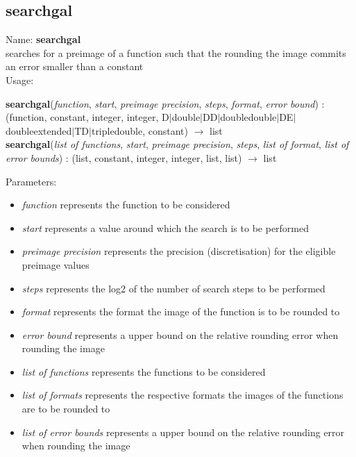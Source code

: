 \subsection{searchgal}
\label{labsearchgal}
\noindent Name: \textbf{searchgal}\\
searches for a preimage of a function such that the rounding the image commits an error smaller than a constant\\

\noindent Usage: 
\begin{center}
\textbf{searchgal}(\emph{function}, \emph{start}, \emph{preimage precision}, \emph{steps}, \emph{format}, \emph{error bound}) : (\textsf{function}, \textsf{constant}, \textsf{integer}, \textsf{integer}, \textsf{D$|$double$|$DD$|$doubledouble$|$DE$|$doubleextended$|$TD$|$tripledouble}, \textsf{constant}) $\rightarrow$ \textsf{list}\\
\textbf{searchgal}(\emph{list of functions}, \emph{start}, \emph{preimage precision}, \emph{steps}, \emph{list of format}, \emph{list of error bounds}) : (\textsf{list}, \textsf{constant}, \textsf{integer}, \textsf{integer}, \textsf{list}, \textsf{list}) $\rightarrow$ \textsf{list}\\
\end{center}
Parameters: 
\begin{itemize}
\item \emph{function} represents the function to be considered
\item \emph{start} represents a value around which the search is to be performed
\item \emph{preimage precision} represents the precision (discretisation) for the eligible preimage values
\item \emph{steps} represents the log2 of the number of search steps to be performed
\item \emph{format} represents the format the image of the function is to be rounded to
\item \emph{error bound} represents a upper bound on the relative rounding error when rounding the image
\item \emph{list of functions} represents the functions to be considered
\item \emph{list of formats} represents the respective formats the images of the functions are to be rounded to
\item \emph{list of error bounds} represents a upper bound on the relative rounding error when rounding the image
\end{itemize}
